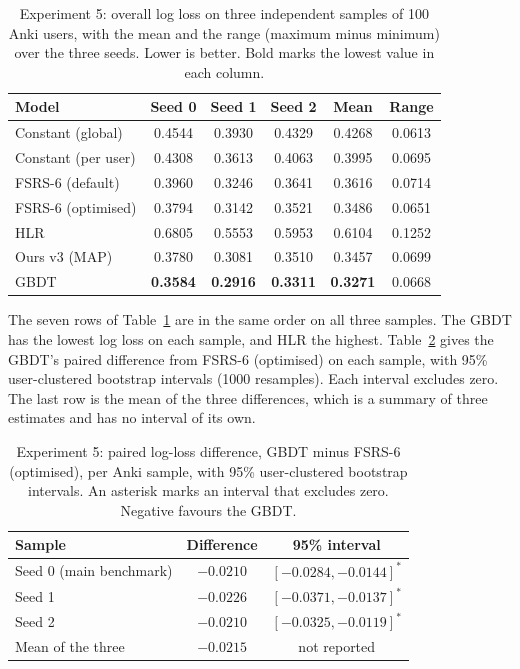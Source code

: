 \begin{table}[htbp]
  \centering
  \caption[Experiment 5: log loss over three Anki samples]{Experiment 5: overall log loss on three independent samples of 100 Anki users, with the
    mean and the range (maximum minus minimum) over the three seeds. Lower is better. Bold marks the lowest value in each column.}
  \label{tab:exp5-seeds}
  \begin{tabular}{@{}lccccc@{}}
    \toprule
    Model & Seed 0 & Seed 1 & Seed 2 & Mean & Range \\
    \midrule
    Constant (global) & 0.4544 & 0.3930 & 0.4329 & 0.4268 & 0.0613 \\
    Constant (per user) & 0.4308 & 0.3613 & 0.4063 & 0.3995 & 0.0695 \\
    FSRS-6 (default) & 0.3960 & 0.3246 & 0.3641 & 0.3616 & 0.0714 \\
    FSRS-6 (optimised) & 0.3794 & 0.3142 & 0.3521 & 0.3486 & 0.0651 \\
    HLR & 0.6805 & 0.5553 & 0.5953 & 0.6104 & 0.1252 \\
    Ours v3 (MAP) & 0.3780 & 0.3081 & 0.3510 & 0.3457 & 0.0699 \\
    GBDT & \textbf{0.3584} & \textbf{0.2916} & \textbf{0.3311} & \textbf{0.3271} & 0.0668 \\
    \bottomrule
  \end{tabular}
\end{table}

The seven rows of Table~\ref{tab:exp5-seeds} are in the same order on all three samples. The GBDT has the lowest log loss on
each sample, and HLR the highest. Table~\ref{tab:exp5-seed-diff} gives the GBDT's paired difference from FSRS-6 (optimised) on each sample,
with 95\% user-clustered bootstrap intervals (1000 resamples). Each interval excludes zero. The last row is the mean of the
three differences, which is a summary of three estimates and has no interval of its own.

\begin{table}[htbp]
  \centering
  \caption[Experiment 5: GBDT minus FSRS-6 over three samples]{Experiment 5: paired log-loss difference, GBDT minus FSRS-6 (optimised), per
    Anki sample, with 95\% user-clustered bootstrap intervals. An asterisk marks an interval that excludes zero. Negative favours the GBDT.}
  \label{tab:exp5-seed-diff}
  \begin{tabular}{@{}lcc@{}}
    \toprule
    Sample & Difference & 95\% interval \\
    \midrule
    Seed 0 (main benchmark) & $-0.0210$ & $[-0.0284, -0.0144]^{*}$ \\
    Seed 1 & $-0.0226$ & $[-0.0371, -0.0137]^{*}$ \\
    Seed 2 & $-0.0210$ & $[-0.0325, -0.0119]^{*}$ \\
    \midrule
    Mean of the three & $-0.0215$ & not reported \\
    \bottomrule
  \end{tabular}
\end{table}

